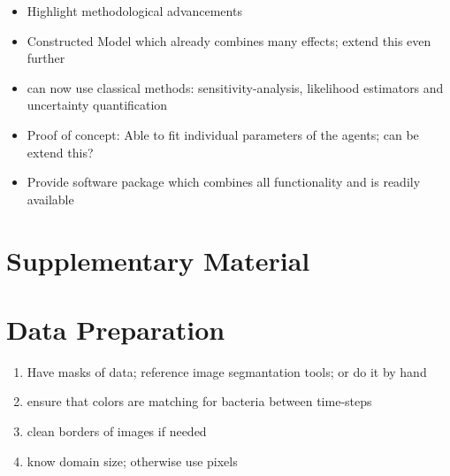 \documentclass{article}
\begin{document}
\begin{itemize}
    \item Highlight methodological advancements
    \item Constructed Model which already combines many effects; extend this even further
    \item can now use classical methods: sensitivity-analysis, likelihood estimators and uncertainty quantification
    \item Proof of concept: Able to fit individual parameters of the agents; can be extend this?
    \item Provide software package which combines all functionality and is readily available
\end{itemize}

% 




\appendix
\section*{Supplementary Material}

\renewcommand{\thesection}{S\arabic{section}}

\section{Data Preparation}
\begin{enumerate}
    \item Have masks of data; reference image segmantation tools; or do it by hand
    \item ensure that colors are matching for bacteria between time-steps
    \item clean borders of images if needed
    \item know domain size; otherwise use pixels
\end{enumerate}
\end{document}
